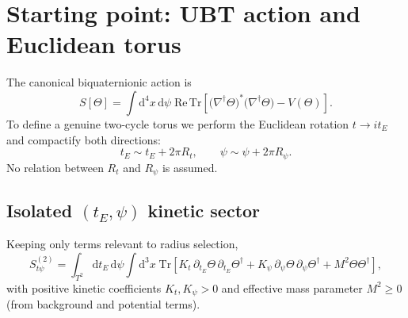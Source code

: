 \documentclass[12pt,a4paper]{article}
\title{\textbf{Self-Dual Torus Condition from the UBT Action}\[4pt]
\large Derive or Reject $R_t=R_\psi$ Without Input Fitting}
\author{Ing.\ David Jaro\v{s}}
\date{2026-05-09}
\theoremstyle{definition}
\theoremstyle{remark}
\newcommand{\dd}{\mathrm{d}}
\newcommand{\Tr}{\mathrm{Tr}}
\newcommand{\Real}{\mathrm{Re}}
\begin{document}
\maketitle

\begin{abstract}
We test whether the UBT action $S[\Theta]$ dynamically selects the square
complex-time torus, i.e.\ $R_t=R_\psi$ (equivalently $\tau=i$ after
normalisation and zero tilt). Starting from the canonical kinetic term,
we compactify Euclidean time $t_E\sim t_E+2\pi R_t$ and imaginary time
$\psi\sim\psi+2\pi R_\psi$, isolate the $(t_E,\psi)$ kinetic sector, and derive
the one-loop effective free energy $F(R_t,R_\psi)$ for independent radii.
Result: the shape mode has a stationary point at $R_t=R_\psi$ and the square
point is locally stable under explicit spectral assumptions, but the action
does not fix the overall size modulus. Therefore the full statement
``UBT selects $R_t=R_\psi$ from first principles'' is conditional.
\end{abstract}

\tableofcontents
\newpage

\section{Starting point: UBT action and Euclidean torus}

The canonical biquaternionic action is
\begin{equation}
S[\Theta]
=\int \dd^4x\,\dd\psi\;\Real\,\Tr\!\left[
\bigl(\nabla^\dagger\Theta\bigr)^*\bigl(\nabla^\dagger\Theta\bigr)-V(\Theta)
\right].
\label{eq:action}
\end{equation}
To define a genuine two-cycle torus we perform the Euclidean rotation
$t\to i t_E$ and compactify both directions:
\begin{equation}
t_E\sim t_E+2\pi R_t,
\qquad
\psi\sim\psi+2\pi R_\psi.
\end{equation}
No relation between $R_t$ and $R_\psi$ is assumed.

\subsection{Isolated $(t_E,\psi)$ kinetic sector}

Keeping only terms relevant to radius selection,
\begin{equation}
S_{t\psi}^{(2)}
=\int_{T^2}\dd t_E\,\dd\psi\int \dd^3x\;
\Tr\!\left[
K_t\,\partial_{t_E}\Theta\,\partial_{t_E}\Theta^\dagger
+K_\psi\,\partial_\psi\Theta\,\partial_\psi\Theta^\dagger
+M^2\Theta\Theta^\dagger
\right],
\label{eq:kinetic-sector}
\end{equation}
with positive kinetic coefficients $K_t,K_\psi>0$ and effective mass parameter
$M^2\ge 0$ (from background and potential terms).
\end{document}
